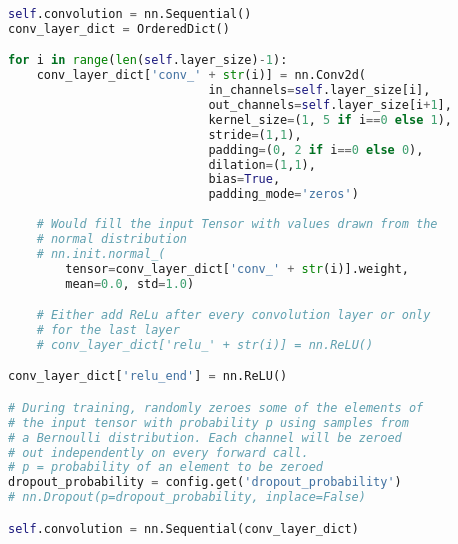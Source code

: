 \begin{lstlisting}[language=Python,frame=single,breaklines=true,float=tbh,caption=Neural network architecture of SNRM PyTorch implementation,label=neural-network-architecture-pytorch]
self.convolution = nn.Sequential()
conv_layer_dict = OrderedDict()

for i in range(len(self.layer_size)-1):
    conv_layer_dict['conv_' + str(i)] = nn.Conv2d(
                            in_channels=self.layer_size[i], 
                            out_channels=self.layer_size[i+1],
                            kernel_size=(1, 5 if i==0 else 1), 
                            stride=(1,1),
                            padding=(0, 2 if i==0 else 0),
                            dilation=(1,1),
                            bias=True,
                            padding_mode='zeros')
                                                    
    # Would fill the input Tensor with values drawn from the 
    # normal distribution
    # nn.init.normal_(
        tensor=conv_layer_dict['conv_' + str(i)].weight, 
        mean=0.0, std=1.0)

    # Either add ReLu after every convolution layer or only 
    # for the last layer
    # conv_layer_dict['relu_' + str(i)] = nn.ReLU()

conv_layer_dict['relu_end'] = nn.ReLU()

# During training, randomly zeroes some of the elements of 
# the input tensor with probability p using samples from 
# a Bernoulli distribution. Each channel will be zeroed 
# out independently on every forward call. 
# p = probability of an element to be zeroed
dropout_probability = config.get('dropout_probability')
# nn.Dropout(p=dropout_probability, inplace=False) 

self.convolution = nn.Sequential(conv_layer_dict)
\end{lstlisting}

